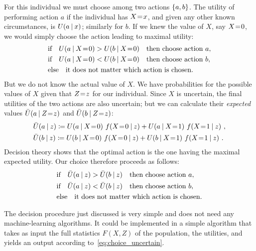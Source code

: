 \documentclass[\ifafour a4paper,12pt,\else a5paper,10pt,\fi%
onecolumn,oneside,article,%
british%
]{memoir}
\theoremstyle{remark}
\theoremstyle{innote}
\newcommand*{\defd}{\coloneqq}
\DeclarePairedDelimiter\set{\{}{\}} %
\renewcommand*{\|}[1][]{\nonscript\:#1\vert\nonscript\:\mathopen{}}
\newcommand*{\mo}[1][=]{\mathrel{\mkern-3.5mu#1\mkern-3.5mu}}
\begin{document}
For this individual we must choose among two actions $\set{a, b}$. The
utility of performing action $a$ if the individual has $X\mo x$, and given
any other known circumstances, is $U(a \| x)$; similarly for $b$. If we
knew the value of $X$, say $X\mo 0$, we would simply choose the action
leading to maximal utility:
\begin{equation}
  \label{eq:choice_ex}
  \begin{aligned}
    &\text{if}\quad U(a \| X\mo 0) > U(b \| X\mo 0) \quad\text{then choose action $a$},
\\
      &\text{if}\quad U(a \| X\mo 0) < U(b \| X\mo 0) \quad\text{then choose action $b$},
\\&\text{else}\quad\text{it does not matter which action is chosen}.
  \end{aligned}
\end{equation}
But we do not know the actual value of $X$. We have probabilities for the
possible values of $X$ given that $Z\mo z$ for our individual. Since $X$ is
uncertain, the final utilities of the two actions are also uncertain; but we can
calculate their \emph{expected} values $\bar{U}(a \| Z \mo z)$ and
$\bar{U}(b \| Z \mo z)$:
\begin{equation}
  \label{eq:expe_util}
  \begin{aligned}
    &\bar{U}(a \| z) \defd
    U(a \| X\mo 0)\ f(X\mo 0 \| z) + U(a \| X\mo 1)\ f(X\mo 1 \| z) \ ,
    \\
    &\bar{U}(b \| z) \defd
    U(b \| X\mo 0)\ f(X\mo 0 \| z) + U(b \| X\mo 1)\ f(X\mo 1 \| z) \ .
\end{aligned}
\end{equation}
Decision theory shows that the optimal action is the one having the maximal
expected utility. Our choice therefore proceeds as follows:
\begin{equation}
  \label{eq:choice_uncertain}
  \begin{aligned}
    &\text{if}\quad \bar{U}(a \| z) > \bar{U}(b \| z) \quad\text{then choose action $a$},
\\
      &\text{if}\quad \bar{U}(a \| z) < \bar{U}(b \| z) \quad\text{then choose action $b$},
\\&\text{else}\quad\text{it does not matter which action is chosen}.
  \end{aligned}
\end{equation}

\medskip

The decision procedure just discussed is very simple and does not need any machine-learning algorithms. It could be implemented in a simple algorithm that takes as input the full statistics $F(X,Z)$ of the population, the utilities, and yields an output according to~\eqref{eq:choice_uncertain}.
\end{document}
